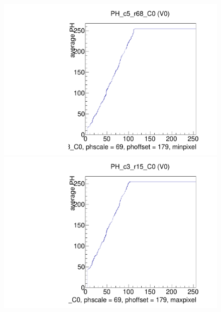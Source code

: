 \begin{figure}[!Hp]
\centering
\begin{minipage}{0.45\textwidth}
  \includegraphics[width=1.0\textwidth]{figures/phopt_PH_c5_r68.pdf}
  \caption{}
  \label{fig:phopt_PH_c5_r68}
\end{minipage}
\hspace{0.3cm}
\begin{minipage}{0.45\textwidth}
  \includegraphics[width=1.0\textwidth]{figures/phopt_PH_c3_r15.pdf}
  \caption{}
  \label{fig:phopt_PH_c3_r15}
\end{minipage}
\end{figure}



